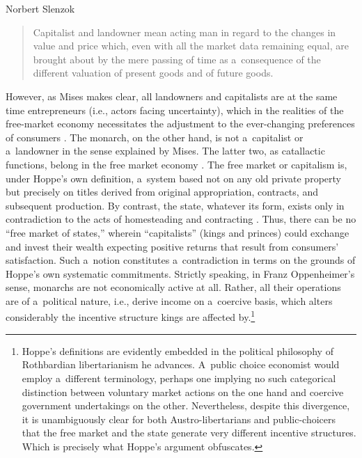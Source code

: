 \begin{artengenv}{Norbert Slenzok}
\begin{quote}
Capitalist and landowner mean acting man in regard to the changes in value and price which, even with all the market data remaining equal, are brought about by the mere passing of time as a~consequence of the different valuation of present goods and of future goods.
\end{quote}



However, as Mises 
\parencite*[][p.254]{mises_human_1998} %
 makes clear, all landowners and capitalists are at the same time entrepreneurs (i.e., actors facing uncertainty), which in the realities of the free-market economy necessitates the adjustment to the ever-changing preferences of consumers 
\parencite*[][pp.270–272]{mises_human_1998}. %
 The monarch, on the other hand, is not a~capitalist or a~landowner in the sense explained by Mises. The latter two, as catallactic functions, belong in the free market economy 
\parencite[][pp.252–256]{mises_human_1998}. %
 The free market or capitalism is, under Hoppe's 
\parencites*[][p.20]{hoppe_theory_2016}[cf.][p.92]{rothbard_man_2009}[][p.320]{rothbard_wall_2011} %
 own definition, a~system based not on any old private property but precisely on titles derived from original appropriation, contracts, and subsequent production. By contrast, the state, whatever its form, exists only in contradiction to the acts of homesteading and contracting 
\parencites[][pp.49–52]{hoppe_theory_2016}[][p.877]{rothbard_man_2009}. %
 Thus, there can be no ``free market of states,'' wherein ``capitalists'' (kings and princes) could exchange and invest their wealth expecting positive returns that result from consumers' satisfaction. Such a~notion constitutes a~contradiction in terms on the grounds of Hoppe's own systematic commitments. Strictly speaking, in Franz Oppenheimer's 
\parencite*[][p.25]{oppenheimer_state_1922} %
 sense, monarchs are not economically active at all. Rather, all their operations are of a~political nature, i.e., derive income on a~coercive basis, which alters considerably the incentive structure kings are affected by.\footnote{Hoppe's definitions are evidently embedded in the political philosophy of Rothbardian libertarianism he advances. A~public choice economist would employ a~different terminology, perhaps one implying no such categorical distinction between voluntary market actions on the one hand and coercive government undertakings on the other. Nevertheless, despite this divergence, it is unambiguously clear for both Austro-libertarians and public-choicers that the free market and the state generate very different incentive structures. Which is precisely what Hoppe's argument obfuscates. }




\end{artengenv}
